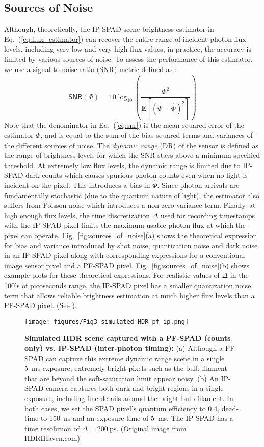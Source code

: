 \subsection{Sources of Noise}
Although, theoretically, the IP-SPAD scene brightness estimator in
Eq.~(\ref{eq:flux_estimator}) can recover the entire range of incident photon
flux levels, including very low and very high flux values, in practice, the
accuracy is limited by various sources of noise. To assess the performance of
this estimator, we use a signal-to-noise ratio (SNR) metric defined as
\cite{yang2011bits,ingle2019high}: 
\begin{equation}
  \mathsf{SNR}(\Phi) = 10 \log_{10} \left( \frac{\Phi^2}{\mathbf{E}[(\Phi-\widehat\Phi)^2]}\right) \label{eq:snr}
\end{equation}
Note that the denominator in Eq.~(\ref{eq:snr}) is the mean-squared-error
of the estimator $\widehat\Phi$, and is equal to the sum of the bias-squared
terms and variances of the different sources of noise.
The \emph{dynamic range} (DR) of the sensor is defined as the range of
brightness levels for which the SNR stays above a minimum specified threshold.
At extremely low flux levels, the dynamic range is limited due to IP-SPAD dark
counts which causes spurious photon counts even when no light is incident
on the pixel. This introduces a bias in $\widehat\Phi$. Since photon arrivals
are fundamentally stochastic (due to the quantum nature of light), the
estimator also suffers from Poisson noise which introduces a non-zero variance
term. Finally, at high enough flux levels, the time discretization $\Delta$
used for recording timestamps with the IP-SPAD pixel limits the maximum usable
photon flux at which the pixel can operate. Fig.~\ref{fig:sources_of_noise}(a)
shows the theoretical expression for bias and variance introduced by shot noise,
quantization noise and dark noise in an IP-SPAD pixel along with corresponding
expressions for a conventional image sensor pixel and a PF-SPAD pixel.
Fig.~\ref{fig:sources_of_noise}(b) shows example plots for these theoretical
expressions. For realistic values of $\Delta$ in the 100's of picoseconds range,
the IP-SPAD pixel has a smaller quantization noise term that allows reliable
brightness estimation at much higher flux levels than a PF-SPAD pixel. (See
\nolink{\ref{suppl:quantization}}). 


\begin{figure}[!ht]
  \centering \texttt{[image: figures/Fig3\_simulated\_HDR\_pf\_ip.png]}
  \caption{\textbf{Simulated HDR scene captured with a PF-SPAD (counts only)
  vs. IP-SPAD (inter-photon timing):}
  (a) Although a PF-SPAD can capture this extreme dynamic range scene in a
  single \SI{5}{\ms} exposure, extremely bright pixels such as the bulb
  filament that are beyond the soft-saturation limit appear noisy.
  (b) An IP-SPAD camera captures both dark and bright regions in a single
  exposure, including fine details around the bright bulb filament.
  In both cases, we set the SPAD pixel's quantum efficiency to 0.4, dead-time
  to \SI{150}{\ns} and an exposure time of \SI{5}{\ms}. The IP-SPAD has a time
  resolution of $\Delta=\SI{200}{\ps}$.  (Original image from
  HDRIHaven.com)\label{fig:sim_hdr}}
\end{figure}

